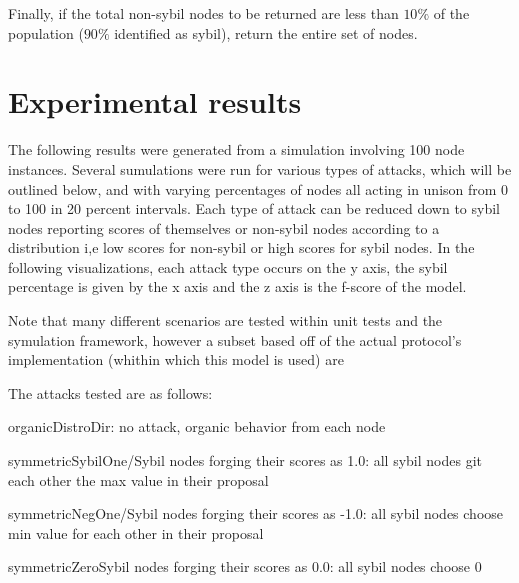 \documentclass{article}
\begin{document}
Finally, if the total non-sybil nodes to be returned are less than $10\%$ of the population ($90\%$ identified as sybil), return the entire set of nodes.


\section{Experimental results}
The following results were generated from a simulation involving 100 node instances. Several sumulations were run for various types of attacks, which will be outlined below, and with varying percentages of nodes all acting in unison from 0 to 100 in 20 percent intervals. Each type of attack can be reduced down to sybil nodes reporting scores of themselves or non-sybil nodes according to a distribution i,e low scores for non-sybil or high scores for sybil nodes. In the following visualizations, each attack type occurs on the y axis, the sybil percentage is given by the x axis and the z axis is the f-score of the model.

Note that many different scenarios are tested within unit tests and the symulation framework, however a subset based off of the actual protocol's implementation (whithin which this model is used) are 

The attacks tested are as follows:

organicDistroDir: no attack, organic behavior from each node

symmetricSybilOne/Sybil nodes forging their scores as 1.0: all sybil nodes git each other the max value in their proposal

symmetricNegOne/Sybil nodes forging their scores as -1.0: all sybil nodes choose min value for each other in their proposal

symmetricZeroSybil nodes forging their scores as 0.0: all sybil nodes choose 0
\end{document}
